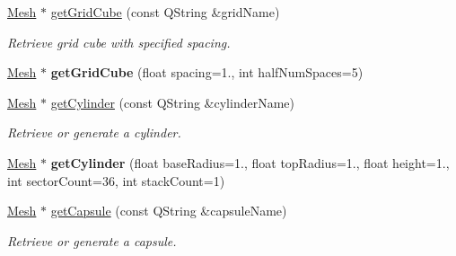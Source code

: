 \begin{Indent}
\begin{DoxyCompactItemize}
\item 
\mbox{\label{classrev_1_1_polygon_cache_ac4fc2987b054fdebe3a6aafd9bc0919e}} 
\mbox{\hyperlink{classrev_1_1_mesh}{Mesh}} $\ast$ \mbox{\hyperlink{classrev_1_1_polygon_cache_ac4fc2987b054fdebe3a6aafd9bc0919e}{get\+Grid\+Cube}} (const Q\+String \&grid\+Name)
\begin{DoxyCompactList}\small\item\em Retrieve grid cube with specified spacing. \end{DoxyCompactList}\item 
\mbox{\label{classrev_1_1_polygon_cache_abeb823bc7d3b44dfb923e6e7a1a31f86}} 
\mbox{\hyperlink{classrev_1_1_mesh}{Mesh}} $\ast$ {\bfseries get\+Grid\+Cube} (float spacing=1., int half\+Num\+Spaces=5)
\item 
\mbox{\label{classrev_1_1_polygon_cache_a59bee527acef7b70341c75c7a9619c66}} 
\mbox{\hyperlink{classrev_1_1_mesh}{Mesh}} $\ast$ \mbox{\hyperlink{classrev_1_1_polygon_cache_a59bee527acef7b70341c75c7a9619c66}{get\+Cylinder}} (const Q\+String \&cylinder\+Name)
\begin{DoxyCompactList}\small\item\em Retrieve or generate a cylinder. \end{DoxyCompactList}\item 
\mbox{\label{classrev_1_1_polygon_cache_a014ee276b3e789c0e9f7ef36513c1954}} 
\mbox{\hyperlink{classrev_1_1_mesh}{Mesh}} $\ast$ {\bfseries get\+Cylinder} (float base\+Radius=1., float top\+Radius=1., float height=1., int sector\+Count=36, int stack\+Count=1)
\item 
\mbox{\label{classrev_1_1_polygon_cache_a9b051e3a8b8ceef9e8b96235cc2a5aba}} 
\mbox{\hyperlink{classrev_1_1_mesh}{Mesh}} $\ast$ \mbox{\hyperlink{classrev_1_1_polygon_cache_a9b051e3a8b8ceef9e8b96235cc2a5aba}{get\+Capsule}} (const Q\+String \&capsule\+Name)
\begin{DoxyCompactList}\small\item\em Retrieve or generate a capsule. \end{DoxyCompactList}\item 
\mbox{\label{classrev_1_1_polygon_cache_aef290227d4a311d1771afffc38ad570e}} 

\end{DoxyCompactItemize}
\end{Indent}
